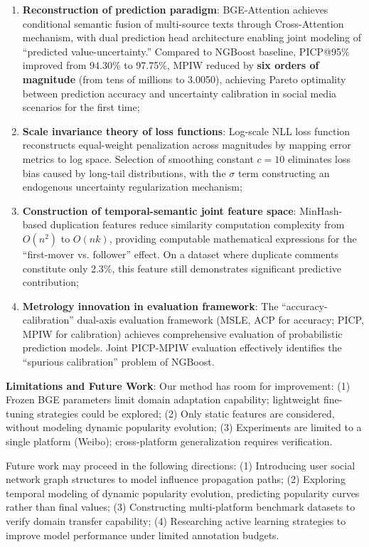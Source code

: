 \documentclass[10pt]{article}
\begin{document}
\begin{enumerate}[leftmargin=*]
    \item \textbf{Reconstruction of prediction paradigm}: BGE-Attention achieves conditional semantic fusion of multi-source texts through Cross-Attention mechanism, with dual prediction head architecture enabling joint modeling of ``predicted value-uncertainty.'' Compared to NGBoost baseline, PICP@95\% improved from 94.30\% to 97.75\%, MPIW reduced by \textbf{six orders of magnitude} (from tens of millions to 3.0050), achieving Pareto optimality between prediction accuracy and uncertainty calibration in social media scenarios for the first time;

    \item \textbf{Scale invariance theory of loss functions}: Log-scale NLL loss function reconstructs equal-weight penalization across magnitudes by mapping error metrics to log space. Selection of smoothing constant $c=10$ eliminates loss bias caused by long-tail distributions, with the $\sigma$ term constructing an endogenous uncertainty regularization mechanism;

    \item \textbf{Construction of temporal-semantic joint feature space}: MinHash-based duplication features reduce similarity computation complexity from $O(n^2)$ to $O(nk)$, providing computable mathematical expressions for the ``first-mover vs. follower'' effect. On a dataset where duplicate comments constitute only 2.3\%, this feature still demonstrates significant predictive contribution;

    \item \textbf{Metrology innovation in evaluation framework}: The ``accuracy-calibration'' dual-axis evaluation framework (MSLE, ACP for accuracy; PICP, MPIW for calibration) achieves comprehensive evaluation of probabilistic prediction models. Joint PICP-MPIW evaluation effectively identifies the ``spurious calibration'' problem of NGBoost.
\end{enumerate}

\textbf{Limitations and Future Work}: Our method has room for improvement: (1) Frozen BGE parameters limit domain adaptation capability; lightweight fine-tuning strategies could be explored; (2) Only static features are considered, without modeling dynamic popularity evolution; (3) Experiments are limited to a single platform (Weibo); cross-platform generalization requires verification.

Future work may proceed in the following directions: (1) Introducing user social network graph structures to model influence propagation paths; (2) Exploring temporal modeling of dynamic popularity evolution, predicting popularity curves rather than final values; (3) Constructing multi-platform benchmark datasets to verify domain transfer capability; (4) Researching active learning strategies to improve model performance under limited annotation budgets.
\end{document}
